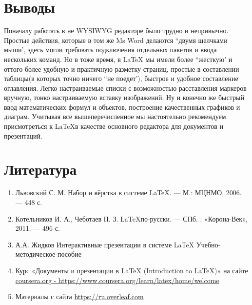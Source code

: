 \documentclass[14pt, a4paper]{extarticle}
\begin{document}
\section{Выводы}
Поначалу работать в не WYSIWYG редакторе было трудно и непривычно. Простые действия, которые в том же Ms Word делаются ``двумя щелчками мыши', здесь могли требовать подключения отдельных пакетов и ввода нескольких команд. Но в тоже время, в LaTeX мы имели более ``жесткую' и оттого более удобную и практичную разметку страниц, простые в составлении таблицы(в которых точно ничего ``не поедет'), быстрое и удобное составление оглавления. Легко настраиваемые списки с возможностью расставления маркеров вручную, тонко настраиваемую вставку изображений. Ну и конечно же быстрый ввод математических формул и объектов, построение качественных графиков и диаграм. Учитывая все вышеперечисленное мы настоятельно рекомендуем присмотреться к  \LaTeX  в качестве основного редактора для документов и презентаций. 
\section{Литература}
\begin{enumerate} 
\item Львовский С. М. Набор и вёрстка в системе \LaTeX. — М.: МЦНМО, 2006. — 448 с.
\item Котельников И. А., Чеботаев П. З. \LaTeX по-русски. — СПб. : «Корона-Век», 2011. — 496 с.
\item А.А. Жидков Интерактивные презентации в системе \LaTeX
Учебно-методическое пособие
\item Курс «Документы и презентации в LaTeX (Introduction to \LaTeX)» на сайте \url{coursera.org - https://www.coursera.org/learn/latex/home/welcome}
\item Материалы с сайта \url{https://ru.overleaf.com}
\end{enumerate}
\end{document}
